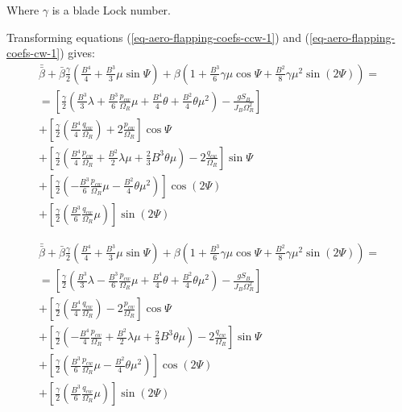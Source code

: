 Where $\gamma$ is a blade Lock number.

Transforming equations (\ref{eq-aero-flapping-coefs-ccw-1}) and (\ref{eq-aero-flapping-coefs-cw-1}) gives:
\begin{multline}
  \label{eq-aero-flapping-coefs-ccw-2}
  \bar{\bar \beta} + \bar \beta \frac{\gamma}{2}
  \left( \frac{B^4}{4} + \frac{B^3}{3} \mu \sin \Psi \right)
  + \beta \left(
    1 + \frac{B^3}{6} \gamma \mu \cos \Psi
    + \frac{B^2}{8} \gamma \mu^2 \sin \left( 2 \Psi \right)
  \right)
  = \\ =
  \left[
    \frac{\gamma}{2}
    \left(
        \frac{B^3}{3} \lambda
      + \frac{B^3}{6} \frac{p_{cw}}{\Omega_R} \mu
      + \frac{B^4}{4} \theta
      + \frac{B^2}{4} \theta \mu^2
    \right)
    - \frac{ g S_B }{ J_B \Omega_R^2 }
  \right]
  \\
  + \left[
    \frac{\gamma}{2}
    \left( \frac{B^4}{4} \frac{q_{cw}}{\Omega_R} \right)
    + 2 \frac{p_{cw}}{\Omega_R}
  \right] \cos \Psi
  \\
  + \left[
    \frac{\gamma}{2}
    \left(
        \frac{B^4}{4} \frac{p_{cw}}{\Omega_R}
      + \frac{B^2}{2} \lambda \mu
      + \frac{2}{3} B^3 \theta \mu
    \right)
    - 2 \frac{q_{cw}}{\Omega_R}
  \right] \sin \Psi
  \\
  + \left[
    \frac{\gamma}{2}
    \left(
      - \frac{B^3}{6} \frac{p_{cw}}{\Omega_R} \mu
      - \frac{B^2}{4} \theta \mu^2
    \right)
  \right] \cos \left( 2 \Psi \right)
  \\
  + \left[
    \frac{\gamma}{2}
    \left( \frac{B^3}{6} \frac{q_{cw}}{\Omega_R} \mu \right)
  \right] \sin \left( 2 \Psi \right)
\end{multline}

\vfill

\begin{multline}
  \label{eq-aero-flapping-coefs-cw-2}
  \bar{\bar \beta} + \bar \beta \frac{\gamma}{2}
  \left( \frac{B^4}{4} + \frac{B^3}{3} \mu \sin \Psi \right)
  + \beta \left(
    1 + \frac{B^3}{6} \gamma \mu \cos \Psi
    + \frac{B^2}{8} \gamma \mu^2 \sin \left( 2 \Psi \right)
  \right)
  = \\ =
  \left[
    \frac{\gamma}{2}
    \left(
        \frac{B^3}{3} \lambda
      - \frac{B^3}{6} \frac{p_{cw}}{\Omega_R} \mu
      + \frac{B^4}{4} \theta
      + \frac{B^2}{4} \theta \mu^2
    \right)
    - \frac{ g S_B }{ J_B \Omega_R^2 }
  \right]
  \\
  + \left[
    \frac{\gamma}{2}
    \left( \frac{B^4}{4} \frac{q_{cw}}{\Omega_R} \right)
    - 2 \frac{p_{cw}}{\Omega_R}
  \right] \cos \Psi
  \\
  + \left[
    \frac{\gamma}{2}
    \left(
      - \frac{B^4}{4} \frac{p_{cw}}{\Omega_R}
      + \frac{B^2}{2} \lambda \mu
      + \frac{2}{3} B^3 \theta \mu
    \right)
    - 2 \frac{q_{cw}}{\Omega_R}
  \right] \sin \Psi
  \\
  + \left[
    \frac{\gamma}{2}
    \left(
        \frac{B^3}{6} \frac{p_{cw}}{\Omega_R} \mu
      - \frac{B^2}{4} \theta \mu^2
    \right)
  \right] \cos \left( 2 \Psi \right)
  \\
  + \left[
    \frac{\gamma}{2}
    \left( \frac{B^3}{6} \frac{q_{cw}}{\Omega_R} \mu \right)
  \right] \sin \left( 2 \Psi \right)
\end{multline}

